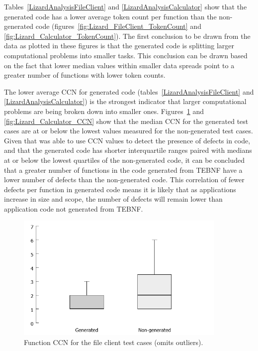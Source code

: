 \indent
Tables~\ref{LizardAnalysisFileClient} and \ref{LizardAnalysisCalculator} show that the generated code has a lower average token count per function than the non-generated code (figures~\ref{fig:Lizard_FileClient_TokenCount} and \ref{fig:Lizard_Calculator_TokenCount}).  The first conclusion to be drawn from the data as plotted in these figures is that the generated code is splitting larger computational problems into smaller tasks.  This conclusion can be drawn based on the fact that lower median values within smaller data spreads point to a greater number of functions with lower token counts.

\indent
The lower average CCN for generated code (tables~\ref{LizardAnalysisFileClient} and \ref{LizardAnalysisCalculator}) is the strongest indicator that larger computational problems are being broken down into smaller ones.  Figures~\ref{fig:Lizard_FileClient_CCN} and \ref{fig:Lizard_Calculator_CCN} show that the median CCN for the generated test cases are at or below the lowest values measured for the non-generated test cases.  Given that \cite{zhang_01} was able to use CCN values to detect the presence of defects in code, and that the generated code has shorter interquartile ranges paired with medians at or below the lowest quartiles of the non-generated code, it can be concluded that a greater number of functions in the code generated from TEBNF have a lower number of defects than the non-generated code.  This correlation of fewer defects per function in generated code means it is likely that as applications increase in size and scope, the number of defects will remain lower than application code not generated from TEBNF.

\begin{figure}[h!]
\centering
\includegraphics[width=0.9\textwidth]{figures/Lizard_FileClient_CCN.png}
\caption[Function CCN for the file client test cases.]{Function CCN for the file client test cases (omits outliers).}
\label{fig:Lizard_FileClient_CCN}
\end{figure}

